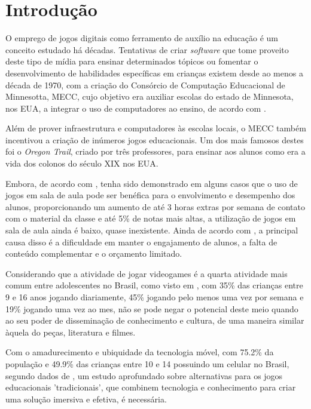 \chapter{Introdução}

O emprego de jogos digitais como ferramento de auxílio na educação é um conceito estudado há décadas. Tentativas de criar \textit{software} que tome proveito deste tipo de mídia para ensinar determinados tópicos ou fomentar o desenvolvimento de habilidades específicas em crianças existem desde ao menos a década de 1970, com a criação do Consórcio de Computação Educacional de Minnesotta, MECC, cujo objetivo era auxiliar escolas do estado de Minnesota, nos EUA, a integrar o uso de computadores ao ensino, de acordo com \cite{lussenhop:2016:oregon-trail}.

Além de prover infraestrutura e computadores às escolas locais, o MECC também incentivou a criação de inúmeros jogos educacionais. Um dos mais famosos destes foi o \textit{Oregon Trail}, criado por três professores, para ensinar aos alunos como era a vida dos colonos do século XIX nos EUA. 

Embora, de acordo com \cite{poli:2012:video-game-spore}, tenha sido demonstrado em alguns casos que o uso de jogos em sala de aula pode ser benéfica para o envolvimento e desempenho dos alunos, proporcionando um aumento de até 3 horas extras por semana de contato com o material da classe e até 5\% de notas mais altas, a utilização de jogos em sala de aula ainda é baixo, quase inexistente. Ainda de acordo com \cite{poli:2012:video-game-spore}, a principal causa disso é a dificuldade em manter o engajamento de alunos, a falta de conteúdo complementar e o orçamento limitado.

Considerando que a atividade de jogar videogames é a quarta atividade mais comum entre adolescentes no Brasil, como visto em \cite{bndes:2014:mapeamento}, com 35\% das crianças entre 9 e 16 anos jogando diariamente, 45\% jogando pelo menos uma vez por semana e 19\% jogando uma vez ao mes, não se pode negar o potencial deste meio quando ao seu poder de disseminação de conhecimento e cultura, de uma maneira similar àquela do peças, literatura e filmes.

Com o amadurecimento e ubiquidade da tecnologia móvel, com 75.2\% da população e 49.9\% das crianças entre 10 e 14 possuindo um celular no Brasil, segundo dados de \cite{IBGE:2015:PNAD_TIC_2013}, um estudo aprofundado sobre alternativas para os jogos educacionais 'tradicionais', que combinem tecnologia e conhecimento para criar uma solução imersiva e efetiva, é necessária.


